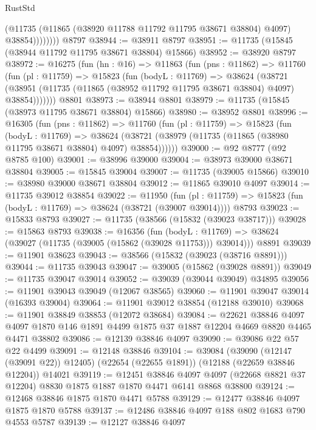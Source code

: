 \begin{lexlean}{RustStd}
\begin{coremodule}
                  (@11735 (@11865 (@38920 @11788 @11792 @11795 @38671 @38804) @4097) @38854))))))))
    @8797
@38944 := @38911 @8797
@38951 := @11735 (@15845 (@38944 @11792 @11795 @38671 @38804) @15866)
@38952 := @38920 @8797
@38972 := @16275
    (fun (hn : @16) =>
    @11863
      (fun (pns : @11862) =>
      @11760
        (fun (pl : @11759) =>
        @15823
          (fun (bodyL : @11769) =>
          @38624
            (@38721
              (@38951 (@11735 (@11865 (@38952 @11792 @11795 @38671 @38804) @4097) @38854)))))))
    @8801
@38973 := @38944 @8801
@38979 := @11735 (@15845 (@38973 @11795 @38671 @38804) @15866)
@38980 := @38952 @8801
@38996 := @16305
    (fun (pns : @11862) =>
    @11760
      (fun (pl : @11759) =>
      @15823
        (fun (bodyL : @11769) =>
        @38624 (@38721 (@38979 (@11735 (@11865 (@38980 @11795 @38671 @38804) @4097) @38854))))))
@39000 := @92 @8777 (@92 @8785 @100)
@39001 := @38996 @39000
@39004 := @38973 @39000 @38671 @38804
@39005 := @15845 @39004
@39007 := @11735 (@39005 @15866)
@39010 := @38980 @39000 @38671 @38804
@39012 := @11865 @39010 @4097
@39014 := @11735 @39012 @38854
@39022 := @11950
    (fun (pl : @11759) => @15823 (fun (bodyL : @11769) => @38624 (@38721 (@39007 @39014))))
    @8793
@39023 := @15833 @8793
@39027 := @11735 (@38566 (@15832 (@39023 @38717)))
@39028 := @15863 @8793
@39038 := @16356
    (fun (bodyL : @11769) => @38624 (@39027 (@11735 (@39005 (@15862 (@39028 @11753))) @39014)))
    @8891
@39039 := @11901 @38623
@39043 := @38566 (@15832 (@39023 (@38716 @8891)))
@39044 := @11735 @39043
@39047 := @39005 (@15862 (@39028 @8891))
@39049 := @11735 @39047 @39014
@39052 := @39039 (@39044 @39049) @34895
@39056 := @11901 @39043 @39049 (@12067 @38565)
@39060 := @11901 @39047 @39014 (@16393 @39004)
@39064 := @11901 @39012 @38854 (@12188 @39010)
@39068 := @11901 @38849 @38853 (@12072 @38684)
@39084 := @22621
    @38846
    @4097
    @4097
    @1870
    @146
    @1891
    @4499
    @1875
    @37
    @1887
    @12204
    @4669
    @8820
    @4465
    @4471
    @38802
@39086 := @12139 @38846 @4097
@39090 := @39086 @22 @57 @22 @4499
@39091 := @12148 @38846
@39104 := @39084
    (@39090 (@12147 (@39091 @22)) @12405)
    (@22654 (@22655 @1891))
    (@12188 (@22659 @38846 @12204))
    @14021
@39119 := @12451
    @38846
    @4097
    @4097
    (@22668 @8821 @37 @12204)
    @8830
    @1875
    @1887
    @1870
    @4471
    @6141
    @8868
    @38800
@39124 := @12468 @38846 @1875 @1870 @4471 @5788
@39129 := @12477 @38846 @4097 @1875 @1870 @5788
@39137 := @12486 @38846 @4097 @188 @802 @1683 @790 @4553 @5787
@39139 := @12127 @38846 @4097

\end{coremodule}
\end{lexlean}
